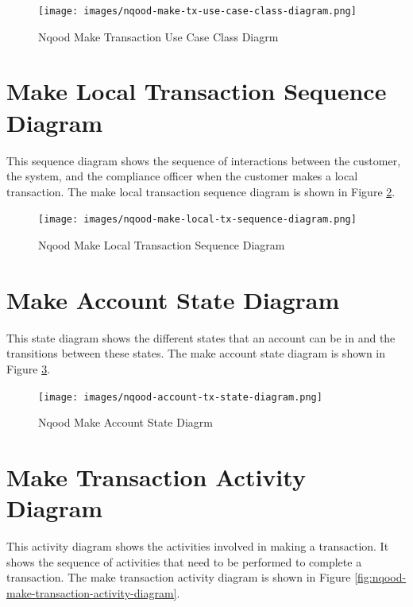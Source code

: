 \documentclass[a4paper]{report}
\begin{document}
\begin{figure}[h!]
    \centering
    \texttt{[image: images/nqood-make-tx-use-case-class-diagram.png]}
    \caption{Nqood Make Transaction Use Case Class Diagrm}
    \label{fig:nqood-make-transaction-use-case-class-diagram}
\end{figure}

\newpage

\section{Make Local Transaction Sequence Diagram}

This sequence diagram shows the sequence of interactions between the customer, the system, and the compliance officer when the customer makes a local transaction. The make local transaction sequence diagram is shown in Figure \ref{fig:nqood-make-local-transaction-sequence-diagram}.

\begin{figure}[h!]
    \centering
    \texttt{[image: images/nqood-make-local-tx-sequence-diagram.png]}
    \caption{Nqood Make Local Transaction Sequence Diagram}
    \label{fig:nqood-make-local-transaction-sequence-diagram}
\end{figure}

\newpage

\section{Make Account State Diagram}

This state diagram shows the different states that an account can be in and the transitions between these states. The make account state diagram is shown in Figure \ref{fig:nqood-make-account-state-diagram}.

\begin{figure}[h!]
    \centering
    \texttt{[image: images/nqood-account-tx-state-diagram.png]}
    \caption{Nqood Make Account State Diagrm}
    \label{fig:nqood-make-account-state-diagram}
\end{figure}

\newpage

\section{Make Transaction Activity Diagram}

This activity diagram shows the activities involved in making a transaction. It shows the sequence of activities that need to be performed to complete a transaction. The make transaction activity diagram is shown in Figure \ref{fig:nqood-make-transaction-activity-diagram}.
\end{document}
